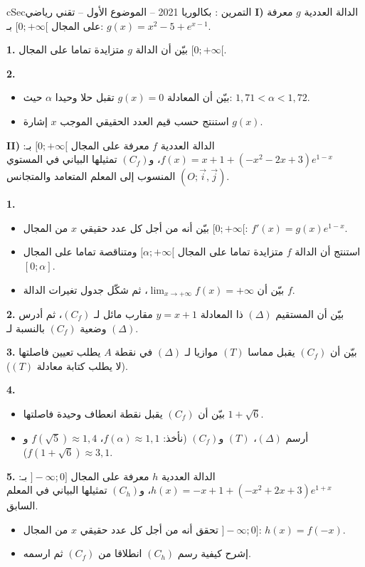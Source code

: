 \documentclass[12pt,a4paper]{article}
\newenvironment{BOX}[2]{\begin{otherlanguage}{english}\begin{arbox}{#1}{#2}}{\end{arbox}\end{otherlanguage}}
\newcounter{exo}
\newenvironment{tamrin}[1]{\stepcounter{exo}\begin{BOX}{cSec}{التمرين \theexo: #1}}{\end{BOX}}
\newenvironment{sq}{\begin{itemize}[leftmargin=2.4em,itemsep=3pt]}{\end{itemize}}
\newcommand{\qa}{\item[(أ)]}\newcommand{\qb}{\item[(ب)]}\newcommand{\qc}{\item[(جـ)]}\newcommand{\qd}{\item[(د)]}\newcommand{\qe}{\item[(هـ)]}
\newcommand{\QQ}[1]{\par\smallskip\textbf{#1.} }
\begin{document}
\begin{tamrin}{بكالوريا 2021 -- الموضوع الأول -- تقني رياضي}
\textbf{I)} الدالة العددية $g$ معرفة على المجال $[0;+\infty[$ بـ: $g(x)=x^2-5+e^{x-1}$.
\QQ{1} بيّن أن الدالة $g$ متزايدة تماما على المجال $[0;+\infty[$.
\QQ{2}
\begin{sq}
\qa بيّن أن المعادلة $g(x)=0$ تقبل حلا وحيدا $\alpha$ حيث: $1{,}71<\alpha<1{,}72$.
\qb استنتج حسب قيم العدد الحقيقي الموجب $x$ إشارة $g(x)$.
\end{sq}

\textbf{II)} الدالة العددية $f$ معرفة على المجال $[0;+\infty[$ بـ: $f(x)=x+1+\left(-x^2-2x+3\right)e^{1-x}$، و$(C_f)$ تمثيلها البياني في المستوي المنسوب إلى المعلم المتعامد والمتجانس $(O;\vec{i},\vec{j})$.
\QQ{1}
\begin{sq}
\qa بيّن أنه من أجل كل عدد حقيقي $x$ من المجال $[0;+\infty[$: $f'(x)=g(x)e^{1-x}$.
\qb استنتج أن الدالة $f$ متزايدة تماما على المجال $[\alpha;+\infty[$ ومتناقصة تماما على المجال $[0;\alpha]$.
\qc بيّن أن $\displaystyle\lim_{x\to+\infty}f(x)=+\infty$، ثم شكّل جدول تغيرات الدالة $f$.
\end{sq}
\QQ{2} بيّن أن المستقيم $(\Delta)$ ذا المعادلة $y=x+1$ مقارب مائل لـ $(C_f)$، ثم أدرس وضعية $(C_f)$ بالنسبة لـ $(\Delta)$.
\QQ{3} بيّن أن $(C_f)$ يقبل مماسا $(T)$ موازيا لـ $(\Delta)$ في نقطة $A$ يطلب تعيين فاصلتها (لا يطلب كتابة معادلة $(T)$).
\QQ{4}
\begin{sq}
\qa بيّن أن $(C_f)$ يقبل نقطة انعطاف وحيدة فاصلتها $1+\sqrt6$.
\qb أرسم $(\Delta)$، $(T)$ و$(C_f)$ (نأخذ: $f(\alpha)\approx1{,}1$، $f\left(\sqrt5\right)\approx1{,}4$ و$f\left(1+\sqrt6\right)\approx3{,}1$).
\end{sq}
\QQ{5} الدالة العددية $h$ معرفة على المجال $]{-}\infty;0]$ بـ: $h(x)=-x+1+\left(-x^2+2x+3\right)e^{1+x}$، و$(C_h)$ تمثيلها البياني في المعلم السابق.
\begin{sq}
\qa تحقق أنه من أجل كل عدد حقيقي $x$ من المجال $]{-}\infty;0]$: $h(x)=f(-x)$.
\qb إشرح كيفية رسم $(C_h)$ انطلاقا من $(C_f)$ ثم ارسمه.
\end{sq}
\end{tamrin}
\end{document}
